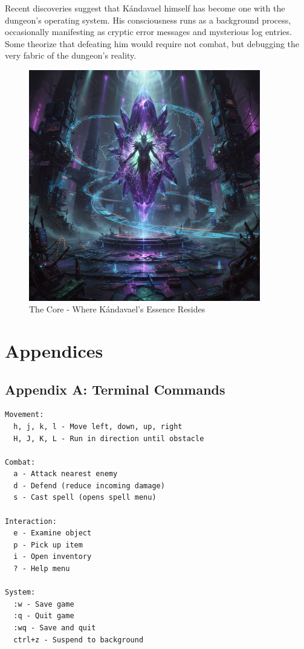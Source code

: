\documentclass[11pt,a4paper]{book}
\begin{document}
Recent discoveries suggest that Kándavael himself has become one with the dungeon's operating system. His consciousness runs as a background process, occasionally manifesting as cryptic error messages and mysterious log entries. Some theorize that defeating him would require not combat, but debugging the very fabric of the dungeon's reality.

\begin{figure}[H]
    \centering
    \includegraphics[width=0.9\textwidth]{images/kandavael-core.png}
    \caption{The Core - Where Kándavael's Essence Resides}
\end{figure}

\chapter{Appendices}

\section{Appendix A: Terminal Commands}

\begin{mechanicsbox}
\begin{verbatim}
Movement:
  h, j, k, l - Move left, down, up, right
  H, J, K, L - Run in direction until obstacle
  
Combat:
  a - Attack nearest enemy
  d - Defend (reduce incoming damage)
  s - Cast spell (opens spell menu)
  
Interaction:
  e - Examine object
  p - Pick up item
  i - Open inventory
  ? - Help menu
  
System:
  :w - Save game
  :q - Quit game
  :wq - Save and quit
  ctrl+z - Suspend to background
\end{verbatim}
\end{mechanicsbox}
\end{document}
